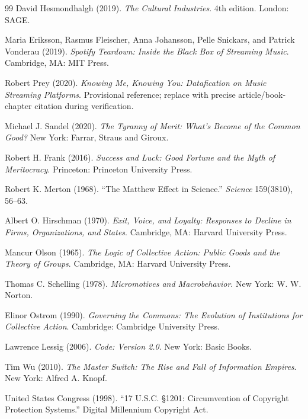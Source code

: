 \documentclass[11pt]{article}
\begin{document}
\begin{thebibliography}{99}
David Hesmondhalgh (2019). \emph{The Cultural Industries}. 4th edition. London: SAGE.

Maria Eriksson, Rasmus Fleischer, Anna Johansson, Pelle Snickars, and Patrick Vonderau (2019). \emph{Spotify Teardown: Inside the Black Box of Streaming Music}. Cambridge, MA: MIT Press.

Robert Prey (2020). \emph{Knowing Me, Knowing You: Datafication on Music Streaming Platforms}. Provisional reference; replace with precise article/book-chapter citation during verification.

Michael J. Sandel (2020). \emph{The Tyranny of Merit: What's Become of the Common Good?} New York: Farrar, Straus and Giroux.

Robert H. Frank (2016). \emph{Success and Luck: Good Fortune and the Myth of Meritocracy}. Princeton: Princeton University Press.

Robert K. Merton (1968). ``The Matthew Effect in Science.'' \emph{Science} 159(3810), 56--63.

Albert O. Hirschman (1970). \emph{Exit, Voice, and Loyalty: Responses to Decline in Firms, Organizations, and States}. Cambridge, MA: Harvard University Press.

Mancur Olson (1965). \emph{The Logic of Collective Action: Public Goods and the Theory of Groups}. Cambridge, MA: Harvard University Press.

Thomas C. Schelling (1978). \emph{Micromotives and Macrobehavior}. New York: W. W. Norton.

Elinor Ostrom (1990). \emph{Governing the Commons: The Evolution of Institutions for Collective Action}. Cambridge: Cambridge University Press.

Lawrence Lessig (2006). \emph{Code: Version 2.0}. New York: Basic Books.

Tim Wu (2010). \emph{The Master Switch: The Rise and Fall of Information Empires}. New York: Alfred A. Knopf.

United States Congress (1998). ``17 U.S.C. \S 1201: Circumvention of Copyright Protection Systems.'' Digital Millennium Copyright Act.


\end{thebibliography}
\end{document}
